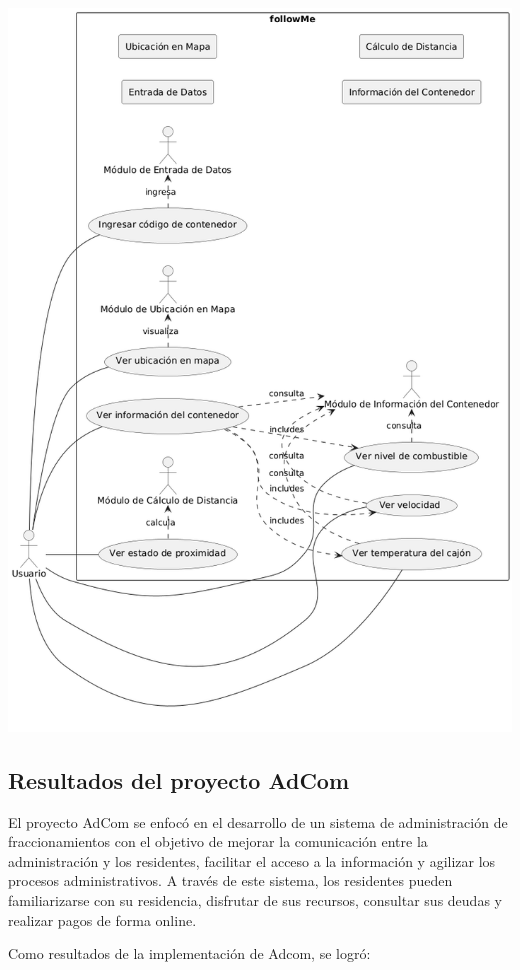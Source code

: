 \documentclass[protocolo.tex]{subfiles}
\begin{document}
\includegraphics[scale=0.5]{Imagenes/followme.png}

\subsection{Resultados del proyecto AdCom}

El proyecto AdCom se enfocó en el desarrollo de un sistema de administración de fraccionamientos con el objetivo de  mejorar la comunicación entre la administración y los residentes,  facilitar el acceso a la información y agilizar los procesos administrativos.  A través de este sistema, los residentes pueden  familiarizarse con su residencia,  disfrutar de sus recursos,  consultar sus deudas y realizar pagos de forma online.\vspace{4mm}

Como resultados de la implementación de Adcom, se logró:
\end{document}

